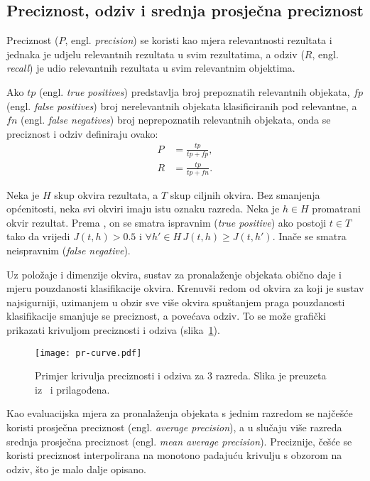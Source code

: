 \documentclass[utf8, diplomski, numeric, lmodern]{fer}
\begin{document}
\subsection{Preciznost, odziv i srednja prosječna preciznost}

Preciznost ($P$, engl. \emph{precision}) se koristi kao mjera relevantnosti rezultata i jednaka je udjelu relevantnih rezultata u svim rezultatima, a odziv ($R$, engl. \emph{recall}) je udio relevantnih rezultata u svim relevantnim objektima. 

Ako $\mathit{tp}$ (engl. \emph{true positives}) predstavlja broj prepoznatih relevantnih objekata, $\mathit{fp}$ (engl. \emph{false positives}) broj nerelevantnih objekata klasificiranih pod relevantne, a $\mathit{fn}$  (engl. \emph{false negatives}) broj neprepoznatih relevantnih objekata, onda se preciznost i odziv definiraju ovako:
\begin{align}
P &= \frac{\mathit{tp}}{\mathit{tp} + \mathit{fp}}, \\
R &= \frac{\mathit{tp}}{\mathit{tp} + \mathit{fn}}.
\end{align}

Neka je $H$ skup okvira rezultata, a $T$ skup ciljnih okvira. Bez smanjenja općenitosti, neka svi okviri imaju istu oznaku razreda. Neka je $h \in H$ promatrani okvir rezultat. Prema \cite{pascalVOC-devkit}, on se smatra ispravnim (\emph{true positive}) ako postoji $t\in T$ tako da vrijedi $J(t,h) > 0.5$ i $\forall h'\in H \, J(t, h) \geq J(t, h')$. Inače se smatra neispravnim (\emph{false negative}).

Uz položaje i dimenzije okvira, sustav za pronalaženje objekata obično daje i mjeru pouzdanosti klasifikacije okvira. Krenuvši redom od okvira za koji je sustav najsigurniji, uzimanjem u obzir sve više okvira spuštanjem praga pouzdanosti klasifikacije smanjuje se preciznost, a povećava odziv. To se može grafički prikazati krivuljom preciznosti i odziva (slika~\ref{fig:pr-krivulja}).

\begin{figure}[htbp] \centering
	\texttt{[image: pr-curve.pdf]}
	\caption{Primjer krivulja preciznosti i odziva za $3$ razreda. Slika je preuzeta iz~\cite{prec-rec} i prilagođena.}
	\label{fig:pr-krivulja}
\end{figure}

Kao evaluacijska mjera za pronalaženja objekata s jednim razredom se najčešće koristi prosječna preciznost (engl. \emph{average precision}), a u slučaju više razreda srednja prosječna preciznost (engl. \emph{mean average precision}). Preciznije, češće se koristi preciznost interpolirana na monotono padajuću krivulju s obzorom na odziv, što je malo dalje opisano.
\end{document}
